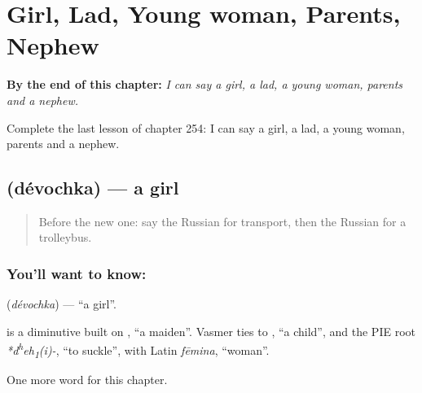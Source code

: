 
\chapter{Girl, Lad, Young woman, Parents, Nephew}
\label{ch:ru-girl-lad-young-woman-parents-nephew}

\begin{chapteropening}
\textbf{By the end of this chapter:} \emph{I can say a girl, a lad, a young woman, parents and a nephew.}

Complete the last lesson of chapter 254: I can say a girl, a lad, a young woman, parents and a nephew.
\end{chapteropening}

\section[\texorpdfstring{\ru{девочка} (dévochka)}{девочка (dévochka)}]{ (dévochka) — a girl}

\label{lesson:RU-C254-devochka}



\begin{quote}
Before the new one: say the Russian for transport, then the Russian for a trolleybus.
\end{quote}

\subsection*{You'll want to know: }
\textbf{} (\emph{dévochka}) — \textquotedblleft{}a girl\textquotedblright{}.

\begin{cousinweb}
\textbf{} is a diminutive built on \emph{}, \textquotedblleft{}a maiden\textquotedblright{}. Vasmer ties \emph{} to \emph{}, \textquotedblleft{}a child\textquotedblright{}, and the PIE root \emph{*d\textsuperscript{h}eh\textsubscript{1}(i)-}, \textquotedblleft{}to suckle\textquotedblright{}, with Latin \emph{fēmina}, \textquotedblleft{}woman\textquotedblright{}.
\end{cousinweb}

\begin{grammarlens}[title={What you've built}]
One more word for this chapter.
\end{grammarlens}

